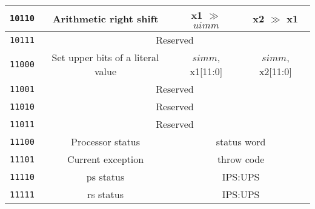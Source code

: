 \begin{center}
\begin{longtable}{|c|c|c|c|}
      \texttt{10110}                       &                      
      Arithmetic right shift               &
      x1 $\gg$ $uimm$                      &
      x2 $\gg$ x1                          \\ \hline

      \texttt{10111}                       &
      \multicolumn{3}{c|}{Reserved}        \\ \hline

      \texttt{11000}                       &
      Set upper bits of a literal value    &
      {$simm$, x1[11:0]}                   &   
      {$simm$, x2[11:0]}                   \\ \hline
 
      \texttt{11001}                       &
      \multicolumn{3}{c|}{Reserved}        \\ \hline


      \texttt{11010}                       &
      \multicolumn{3}{c|}{Reserved}        \\ \hline

      \texttt{11011}                       &
      \multicolumn{3}{c|}{Reserved}        \\ \hline
   
      \texttt{11100}                       &
      Processor status                     &
      \multicolumn{2}{c|}{status word}     \\ \hline

      \texttt{11101}                       &
      Current exception                    &
      \multicolumn{2}{c|}{throw code}      \\ \hline

      \texttt{11110}                       &
      \Gls{ps} status                      &
      \multicolumn{2}{c|}{IPS:UPS}         \\ \hline

      \texttt{11111}                       &
      \Gls{rs} status                      &
      \multicolumn{2}{c|}{IPS:UPS}         \\ \hline
    
  \end{longtable}
\end{center}  
\endgroup

